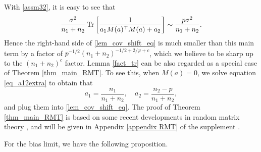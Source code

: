  With \eqref{assm32}, it is easy to see that
$$ \frac{\sigma^2}{n_1+n_2}\operatorname{Tr}\left[  \frac{1}{a_1 M(a)^\top M(a) + a_2  }  \right] \sim \frac{p \sigma^2}{n_1+ n_2}.$$
Hence the right-hand side of \eqref{lem_cov_shift_eq} is much smaller than this main term by a factor of $p^{-1/2} (n_1+n_2)^{-1/2+2/\varphi + c}$, which we believe to be sharp up to the $(n_1+n_2)^c$ factor. Lemma \ref{fact_tr} can be also regarded as a special case of Theorem \ref{thm_main_RMT}. %
To see this, when $M(a)=0$, we solve equation \eqref{eq_a12extra} to obtain that
$$a_1 = \frac{n_1}{n_1+n_2},\quad a_2 = \frac{n_2-p}{n_1+ n_2},$$
and plug them into \eqref{lem_cov_shift_eq}.  The proof of Theorem \ref{thm_main_RMT} is based on some recent developments in random matrix theory \cite{Anisotropic}, and will be given in Appendix \ref{appendix RMT} of the supplement \cite{MTL_suppl}.


For the bias limit, we have the following proposition.

